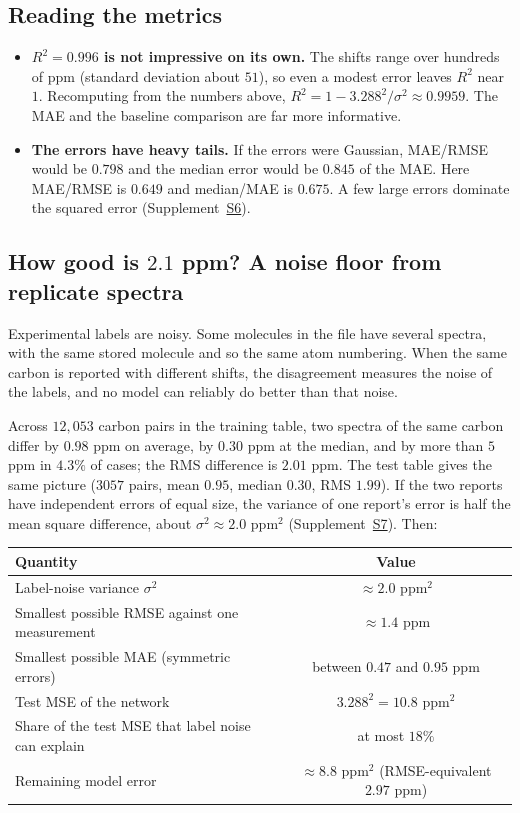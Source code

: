 \documentclass[11pt]{article}
\begin{document}
\subsection*{Reading the metrics}
\begin{itemize}[nosep]
  \item \textbf{$R^2=0.996$ is not impressive on its own.} The shifts range over hundreds of ppm (standard deviation about $51$), so even a modest error leaves $R^2$ near $1$. Recomputing from the numbers above, $R^2=1-3.288^2/\sigma^2\approx0.9959$. The MAE and the baseline comparison are far more informative.
  \item \textbf{The errors have heavy tails.} If the errors were Gaussian, MAE/RMSE would be $0.798$ and the median error would be $0.845$ of the MAE. Here MAE/RMSE is $0.649$ and median/MAE is $0.675$. A few large errors dominate the squared error (Supplement~\hyperref[sec:S6]{S6}).
\end{itemize}

\subsection*{How good is $2.1$ ppm? A noise floor from replicate spectra}
Experimental labels are noisy. Some molecules in the file have several spectra, with the same stored molecule and so the same atom numbering. When the same carbon is reported with different shifts, the disagreement measures the noise of the labels, and no model can reliably do better than that noise.

Across $12{,}053$ carbon pairs in the training table, two spectra of the same carbon differ by $0.98$ ppm on average, by $0.30$ ppm at the median, and by more than $5$ ppm in $4.3\%$ of cases; the RMS difference is $2.01$ ppm. The test table gives the same picture ($3057$ pairs, mean $0.95$, median $0.30$, RMS $1.99$). If the two reports have independent errors of equal size, the variance of one report's error is half the mean square difference, about $\sigma^2\approx2.0$ ppm$^2$ (Supplement~\hyperref[sec:S7]{S7}). Then:

\begin{center}
\small
\begin{tabular}{@{}lc@{}}
\toprule
Quantity & Value\\
\midrule
Label-noise variance $\sigma^2$ & $\approx2.0$ ppm$^2$\\
Smallest possible RMSE against one measurement & $\approx1.4$ ppm\\
Smallest possible MAE (symmetric errors) & between $0.47$ and $0.95$ ppm\\
Test MSE of the network & $3.288^2=10.8$ ppm$^2$\\
Share of the test MSE that label noise can explain & at most $18\%$\\
Remaining model error & $\approx8.8$ ppm$^2$ (RMSE-equivalent $2.97$ ppm)\\
\bottomrule
\end{tabular}
\end{center}
\end{document}
